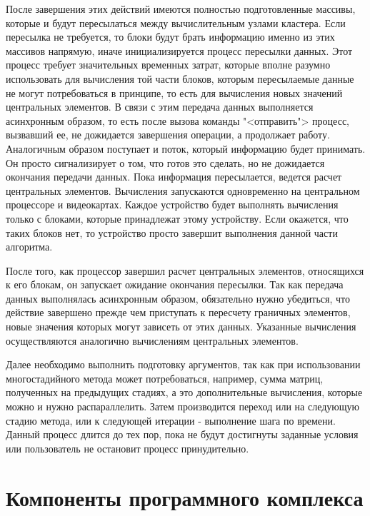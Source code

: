 \documentclass[a4paper, 14pt]{extarticle}
\theoremstyle{definition}
\begin{document}
\par После завершения этих действий имеются полностью подготовленные массивы, которые и будут пересылаться между вычислительным узлами кластера. Если пересылка не требуется, то блоки будут брать информацию именно из этих массивов напрямую, иначе инициализируется процесс пересылки данных. Этот процесс требует значительных временных затрат, которые вполне разумно использовать для вычисления той части блоков, которым пересылаемые данные не могут потребоваться в принципе, то есть для вычисления новых значений центральных элементов. В связи с этим передача данных выполняется асинхронным образом, то есть после вызова команды "<отправить"> процесс, вызвавший ее, не дожидается завершения операции, а продолжает работу. Аналогичным образом поступает и поток, который информацию будет принимать. Он просто сигнализирует о том, что готов это сделать, но не дожидается окончания передачи данных. Пока информация пересылается, ведется расчет центральных элементов. Вычисления запускаются одновременно на центральном процессоре и видеокартах. Каждое устройство будет выполнять вычисления только с блоками, которые принадлежат этому устройству. Если окажется, что таких блоков нет, то устройство просто завершит выполнения данной части алгоритма.

\par После того, как процессор завершил расчет центральных элементов, относящихся к его блокам, он запускает ожидание окончания пересылки. Так как передача данных выполнялась асинхронным образом, обязательно нужно убедиться, что действие завершено прежде чем приступать к пересчету граничных элементов, новые значения которых могут зависеть от этих данных. Указанные вычисления осуществляются аналогично вычислениям центральных элементов.

\par Далее необходимо выполнить подготовку аргументов, так как при использовании многостадийного метода может потребоваться, например, сумма матриц, полученных на предыдущих стадиях, а это дополнительные вычисления, которые можно и нужно распараллелить. Затем  производится переход или на следующую стадию метода, или к следующей итерации - выполнение шага по времени. Данный процесс длится до тех пор, пока не будут достигнуты заданные условия или пользователь не остановит процесс принудительно.





\section{Компоненты программного комплекса}
\end{document}
